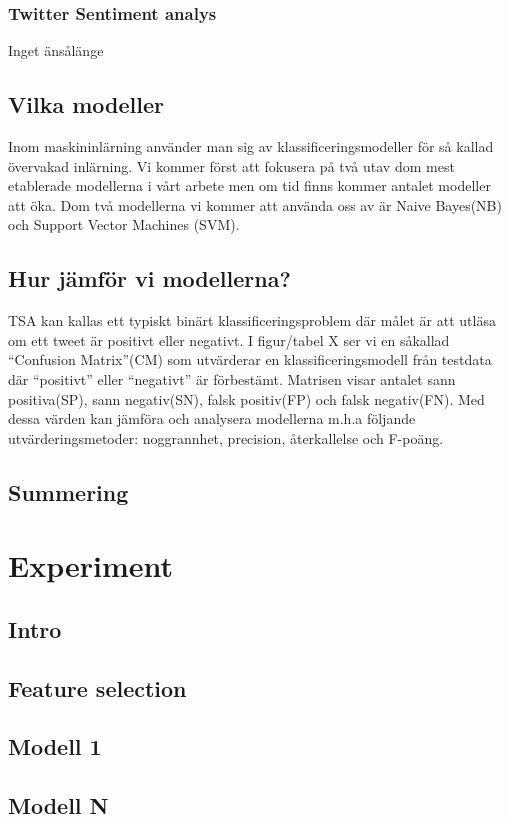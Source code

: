 \documentclass{kaumasters} %
\begin{document}
\subsection{Twitter Sentiment analys}
Inget änsålänge
\section{Vilka modeller}
Inom maskininlärning använder man sig av klassificeringsmodeller för så kallad övervakad inlärning. Vi kommer först att fokusera på två utav dom mest etablerade modellerna i vårt arbete men om tid finns kommer antalet modeller att öka. Dom två modellerna vi kommer att använda oss av är Naive Bayes(NB) och Support Vector Machines (SVM). 

\section{Hur jämför vi modellerna?}
TSA kan kallas ett typiskt binärt klassificeringsproblem där målet är att utläsa om ett tweet är positivt eller negativt. I figur/tabel X ser vi en såkallad “Confusion Matrix”(CM) som utvärderar en klassificeringsmodell från testdata där “positivt” eller “negativt” är förbestämt. Matrisen visar antalet sann positiva(SP), sann negativ(SN), falsk positiv(FP) och falsk negativ(FN). Med dessa värden kan jämföra och analysera modellerna m.h.a följande utvärderingsmetoder: noggrannhet, precision, återkallelse och F-poäng. 
\section{Summering}

\newpage

\chapter{Experiment}
\section{Intro}
\section{Feature selection}
\section{Modell 1}
\section{Modell N}
\end{document}
